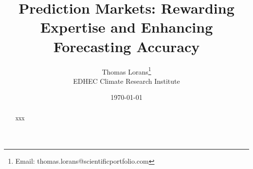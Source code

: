 \documentclass[12pt]{article}
\title{Prediction Markets: Rewarding Expertise and Enhancing Forecasting Accuracy
}
\author{Thomas Lorans\thanks{Email: thomas.lorans@scientificportfolio.com} \\ EDHEC Climate Research Institute}
\date{\today}
\begin{document}
\maketitle

\begin{abstract}
  xxx
\end{abstract}

\newpage

\tableofcontents









\end{document}
